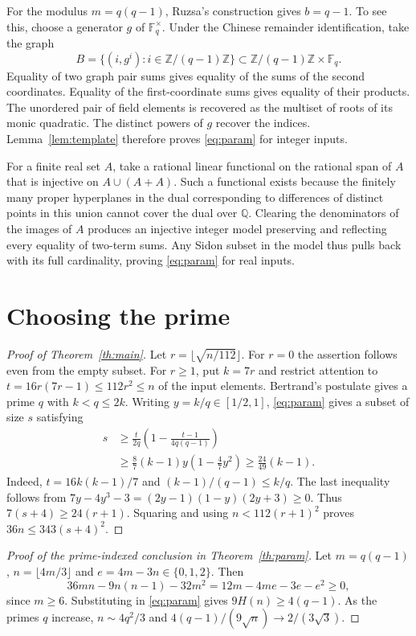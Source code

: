 \documentclass[11pt]{article}
\newcommand{\Z}{\mathbb Z}
\newcommand{\F}{\mathbb F}
\begin{document}
For the modulus \(m=q(q-1)\), Ruzsa's construction
\cite[Theorem~4.4]{ruzsa} gives \(b=q-1\). To see this, choose a
generator \(g\) of \(\F_q^\times\). Under the Chinese remainder
identification, take the graph
\[
  B=\{(i,g^i):i\in\Z/(q-1)\Z\}
     \subset \Z/(q-1)\Z\times\F_q .
\]
Equality of two graph pair sums gives equality of the sums of the
second coordinates. Equality of the first-coordinate sums gives equality
of their products. The unordered pair of field elements is recovered as
the multiset of roots of its monic quadratic. The distinct powers of
\(g\) recover the indices. Lemma~\ref{lem:template} therefore proves
\eqref{eq:param} for integer inputs.

For a finite real set \(A\), take a rational linear functional on the
rational span of \(A\) that is injective on \(A\cup(A+A)\). Such a
functional exists because the finitely many proper hyperplanes in the
dual corresponding to differences of distinct points in this union cannot
cover the dual over \(\mathbb Q\). Clearing the denominators of the
images of \(A\) produces an injective integer model preserving and
reflecting every equality of two-term sums. Any Sidon subset in the model
thus pulls back with its full cardinality, proving \eqref{eq:param}
for real inputs.

\section{Choosing the prime}

\begin{proof}[Proof of Theorem~\ref{th:main}]
Let \(r=\lfloor\sqrt{n/112}\rfloor\).
For \(r=0\) the assertion follows even from the empty subset.
For \(r\ge1\), put \(k=7r\) and restrict attention to
\(t=16r(7r-1)\le112r^2\le n\) of the input elements.
Bertrand's postulate gives a prime \(q\) with \(k<q\le2k\).
Writing \(y=k/q\in[1/2,1]\), \eqref{eq:param} gives a subset of size
\(s\) satisfying
\begin{align*}
s &\ge \frac{t}{2q}\left(1-\frac{t-1}{4q(q-1)}\right)\\
  &\ge \frac87(k-1)y\left(1-\frac47 y^2\right)
   \ge \frac{24}{49}(k-1).
\end{align*}
Indeed, \(t=16k(k-1)/7\) and \((k-1)/(q-1)\le k/q\).
The last inequality follows from
\(7y-4y^3-3=(2y-1)(1-y)(2y+3)\ge0\).
Thus \(7(s+4)\ge24(r+1)\). Squaring and using
\(n<112(r+1)^2\) proves \(36n\le343(s+4)^2\).
\end{proof}

\begin{proof}[Proof of the prime-indexed conclusion in Theorem~\ref{th:param}]
Let \(m=q(q-1)\), \(n=\lfloor4m/3\rfloor\) and \(e=4m-3n\in\{0,1,2\}\).
Then
\[
  36mn-9n(n-1)-32m^2=12m-4me-3e-e^2\ge0,
\]
since \(m\ge6\). Substituting in \eqref{eq:param} gives
\(9H(n)\ge4(q-1)\). As the primes \(q\) increase, \(n\sim4q^2/3\)
and \(4(q-1)/(9\sqrt n)\to2/(3\sqrt3)\).
\end{proof}
\end{document}
